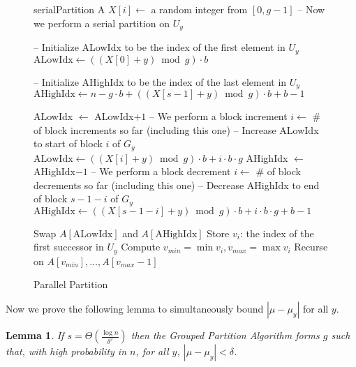\documentclass[twocolumn, twoside, 12pt]{article}
\newtheorem{lemma}{Lemma}
\begin{document}
\begin{figure*}
	\caption{Parallel Partition}
	\label{alg:parallelPartition}
	\begin{algorithmic}[1]
			\State serialPartition A
		\Else
				\State $X[i] \gets$ a random integer from $[0,g-1]$ 
			\EndFor
				\State -- Now we perform a serial partition on $U_y$

				\State -- Initialize ALowIdx to be the index of the first element in $U_y$
				\State $\text{ALowIdx} \gets ((X[0]+y) \bmod g)\cdot b$

				\State -- Initialize AHighIdx to be the index of the last element in $U_y$
				\State $\text{AHighIdx} \gets n - g\cdot b + ((X[s-1]+y) \bmod g)\cdot b + b-1$

						\State ALowIdx $\gets$ ALowIdx$+1$
							\State -- We perform a block increment
							\State $i \gets $ \# of block increments so far (including this one)
							\State -- Increase ALowIdx to start of block $i$ of $G_y$
							\State $\text{ALowIdx} \gets ((X[i] + y)\bmod g) \cdot b + i\cdot b\cdot g$
						\EndIf
					\EndWhile
						\State AHighIdx $\gets$ AHighIdx$-1$
							\State -- We perform a block decrement
							\State $i \gets $ \# of block decrements so far (including this one)
							\State -- Decrease AHighIdx to end of block $s-1-i$ of $G_y$
							\State $\text{AHighIdx} \gets ((X[s-1-i] + y)\bmod g) \cdot b + i\cdot b\cdot g + b - 1$
						\EndIf
					\EndWhile

					\State Swap $A[\text{ALowIdx}]$ and $A[\text{AHighIdx}]$
				\EndWhile
				\State Store $v_i$: the index of the first successor in $U_y$ %
			\EndFor
			\State Compute $v_{min} = \min v_i, v_{max}=\max v_i$%
			\State Recurse on $A[v_{min}],\ldots,A[v_{max}-1]$
		\EndIf
	\end{algorithmic}	
\end{figure*}

Now we prove the following lemma to simultaneously bound $|\mu - \mu_y|$ for all $y$. 
\begin{lemma}
If $s=\Theta(\frac{\log n}{\delta^2})$ then the Grouped Partition Algorithm forms $g$ such that, with high probability in $n$, for all $y$, $|\mu - \mu_y| < \delta$.
\label{lem:groupedAlgDelta}
\end{lemma}
\end{document}
